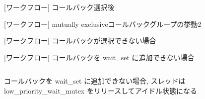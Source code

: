 \begin{frame}{[ワークフロー] コールバック選択後}
\end{frame}

\begin{frame}{[ワークフロー] mutually exclusiveコールバックグループの挙動2}
\end{frame}


\begin{frame}{[ワークフロー] コールバックが選択できない場合}
\end{frame}

\begin{frame}{[ワークフロー] コールバックを wait\_set に追加できない場合}
    \begin{columns}
        \begin{column}{0.4\textwidth}
            コールバックを wait\_set に追加できない場合, スレッドは low\_priority\_wait\_mutex をリリースしてアイドル状態になる
        \end{column}
        \begin{column}{0.6\textwidth}
        \end{column}
    \end{columns}
\end{frame}
